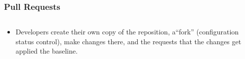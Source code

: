 \documentclass[12pt]{beamer}
\begin{document}
\begin{frame}
\frametitle{Pull Requests}

\begin{columns}
\begin{column}{0.5\textwidth}
    \begin{itemize}
    \item{Developers create their own copy of the reposition, a``fork''
    (\alert{configuration status control}), make changes there, and the requests
    that the changes get applied the baseline.}
    \end{itemize}
\end{column}
\begin{column}{0.5\textwidth}

\end{column}
\end{columns}
\end{frame}
\end{document}
